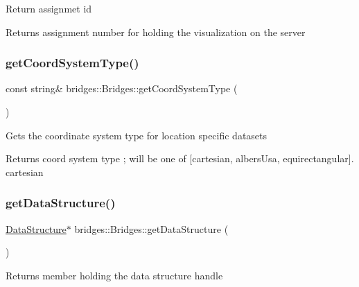 Return assignmet id

\begin{DoxyReturn}{Returns}
assignment number for holding the visualization on the server 
\end{DoxyReturn}
\mbox{\label{classbridges_1_1_bridges_aac3cdb607177ff537f5160c3790d814a}} 
\subsubsection{\texorpdfstring{getCoordSystemType()}{getCoordSystemType()}}
{\footnotesize\ttfamily const string\& bridges\+::\+Bridges\+::get\+Coord\+System\+Type (\begin{DoxyParamCaption}{ }\end{DoxyParamCaption})\hspace{0.3cm}{\ttfamily [inline]}}

Gets the coordinate system type for location specific datasets

\begin{DoxyReturn}{Returns}
coord system type ; will be one of \mbox{[}\textquotesingle{}cartesian\textquotesingle{}, \textquotesingle{}albers\+Usa\textquotesingle{}, \textquotesingle{}equirectangular\textquotesingle{}\mbox{]}. \textquotesingle{}cartesian\textquotesingle{} 
\end{DoxyReturn}
\mbox{\label{classbridges_1_1_bridges_a5ddfb17c2fb2d3ca89e7564677251dea}} 
\subsubsection{\texorpdfstring{getDataStructure()}{getDataStructure()}}
{\footnotesize\ttfamily \mbox{\hyperlink{classbridges_1_1datastructure_1_1_data_structure}{Data\+Structure}}$\ast$ bridges\+::\+Bridges\+::get\+Data\+Structure (\begin{DoxyParamCaption}{ }\end{DoxyParamCaption})\hspace{0.3cm}{\ttfamily [inline]}}

\begin{DoxyReturn}{Returns}
member holding the data structure handle 
\end{DoxyReturn}
\mbox{\label{classbridges_1_1_bridges_ae9f238e1d9fc421c6c08aacb74e0ef6c}} 
